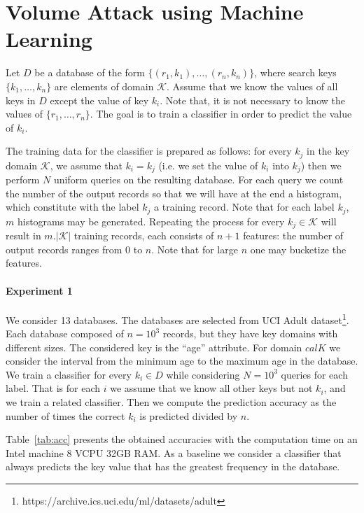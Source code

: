 \documentclass[a4paper,10pt]{article}
\newcommand{\calK}{\mathcal{K}}
\begin{document}
\section{Volume Attack using Machine Learning}
Let $D$ be a database of the form $\{(r_1, k_1), \ldots, (r_n, k_n)\}$, where 
search keys $\{k_1, \ldots, k_n\}$ are elements of domain $\calK$. 
Assume that we know the values of all keys in $D$ except the value of key $k_i$. 
Note that, it is not necessary to know the values of $\{r_1, \ldots, r_n\}$. 
The goal is to train a classifier in order to predict the value of $k_i$. 

The training data for the classifier is prepared as follows:
for every $k_j$ in the key domain $\calK$, 
we assume that $k_i = k_j$ (i.e. we set the value of $k_i$ into $k_j$) 
then we perform $N$ uniform queries on the resulting 
database. For each query we count the number of the output records so that 
we will have at the end a histogram, which constitute with the label $k_j$ 
a training record. Note that for each label $k_j$, $m$ histograms may be generated. 
Repeating the process for every $k_j \in \calK$ will result in $m.|\calK|$ training records, 
each consists of $n+1$ features: the number of output records ranges from 0 to $n$. 
Note that for large $n$ one may bucketize the features. 

\paragraph{Experiment 1}
We consider 13 databases. The databases are selected from UCI Adult dataset\footnote{https://archive.ics.uci.edu/ml/datasets/adult}. 
Each database composed of $n = 10^3$ records, but they have key domains with different sizes. 
The considered key is the ``age'' attribute. For domain $calK$ we consider the interval 
from the minimum age to the maximum age in the database. 
We train a classifier for every $k_i \in D$ while considering $N=10^3$ queries for 
each label. That is for each $i$ we assume that we know all other keys but not $k_i$, and we train a related classifier. 
Then we compute the prediction accuracy as the number of times the 
correct $k_i$ is predicted divided by $n$. 

Table~\ref{tab:acc} presents the obtained accuracies with the computation time on an Intel 
machine 8 VCPU 32GB RAM. 
As a baseline we consider a classifier that always predicts the key value that has the greatest frequency in the database. 
\end{document}
